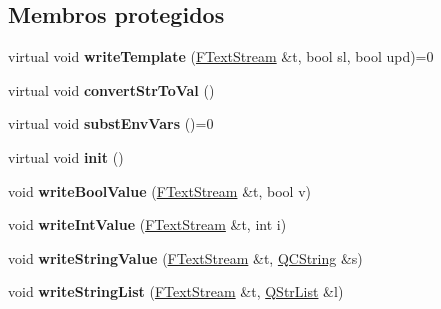 \subsection*{Membros protegidos}
\begin{DoxyCompactItemize}
\item 
\hypertarget{class_config_option_aba8013af8fdfe2786d1a3e6aad982914}{virtual void {\bfseries write\-Template} (\hyperlink{class_f_text_stream}{F\-Text\-Stream} \&t, bool sl, bool upd)=0}\label{class_config_option_aba8013af8fdfe2786d1a3e6aad982914}

\item 
\hypertarget{class_config_option_ac2fe1963b5e322b6bdc4ea8c75e4335c}{virtual void {\bfseries convert\-Str\-To\-Val} ()}\label{class_config_option_ac2fe1963b5e322b6bdc4ea8c75e4335c}

\item 
\hypertarget{class_config_option_a3fe7c7c27837cd6f7e6809d81f00ed45}{virtual void {\bfseries subst\-Env\-Vars} ()=0}\label{class_config_option_a3fe7c7c27837cd6f7e6809d81f00ed45}

\item 
\hypertarget{class_config_option_a9339772ec5ac9fa929938109207f2863}{virtual void {\bfseries init} ()}\label{class_config_option_a9339772ec5ac9fa929938109207f2863}

\item 
\hypertarget{class_config_option_a424b529d2f4edb93222ff26191484266}{void {\bfseries write\-Bool\-Value} (\hyperlink{class_f_text_stream}{F\-Text\-Stream} \&t, bool v)}\label{class_config_option_a424b529d2f4edb93222ff26191484266}

\item 
\hypertarget{class_config_option_a3e5e7dbce7de68b4372d6683d6fa41ec}{void {\bfseries write\-Int\-Value} (\hyperlink{class_f_text_stream}{F\-Text\-Stream} \&t, int i)}\label{class_config_option_a3e5e7dbce7de68b4372d6683d6fa41ec}

\item 
\hypertarget{class_config_option_a0a1f4d85ab9e4d42e353815fd8d9ea27}{void {\bfseries write\-String\-Value} (\hyperlink{class_f_text_stream}{F\-Text\-Stream} \&t, \hyperlink{class_q_c_string}{Q\-C\-String} \&s)}\label{class_config_option_a0a1f4d85ab9e4d42e353815fd8d9ea27}

\item 
\hypertarget{class_config_option_a5b44863e1c725b636cab847e48bd5f1d}{void {\bfseries write\-String\-List} (\hyperlink{class_f_text_stream}{F\-Text\-Stream} \&t, \hyperlink{class_q_str_list}{Q\-Str\-List} \&l)}\label{class_config_option_a5b44863e1c725b636cab847e48bd5f1d}

\end{DoxyCompactItemize}
